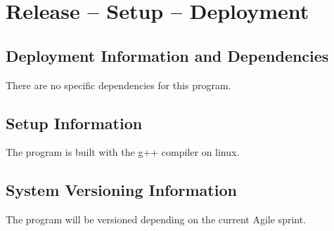 
\chapter{Release -- Setup -- Deployment}


\section{Deployment Information and Dependencies}
There are no specific dependencies for this program.



\section{Setup Information}
The program is built with the g++ compiler on linux.



\section{System  Versioning Information}
The program will be versioned depending on the current Agile sprint.